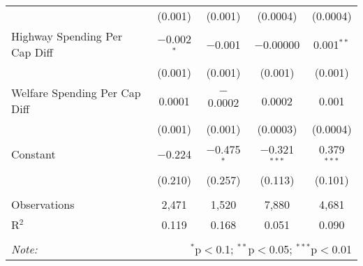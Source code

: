 \begin{table}[!htbp]
\begin{tabular}{@{\extracolsep{5pt}}lcccc}
  & (0.001) & (0.001) & (0.0004) & (0.0004) \\ 
  Highway Spending Per Cap Diff & $-$0.002$^{*}$ & $-$0.001 & $-$0.00000 & 0.001$^{**}$ \\ 
  & (0.001) & (0.001) & (0.001) & (0.001) \\ 
  Welfare Spending Per Cap Diff & 0.0001 & $-$0.0002 & 0.0002 & 0.001 \\ 
  & (0.001) & (0.001) & (0.0003) & (0.0004) \\ 
  Constant & $-$0.224 & $-$0.475$^{*}$ & $-$0.321$^{***}$ & 0.379$^{***}$ \\ 
  & (0.210) & (0.257) & (0.113) & (0.101) \\ 
 \hline \\[-1.8ex] 
Observations & 2,471 & 1,520 & 7,880 & 4,681 \\ 
R$^{2}$ & 0.119 & 0.168 & 0.051 & 0.090 \\ 
\hline 
\hline \\[-1.8ex] 
\textit{Note:}  & \multicolumn{4}{r}{$^{*}$p$<$0.1; $^{**}$p$<$0.05; $^{***}$p$<$0.01} \\ 
\end{tabular} 
\end{table} 
